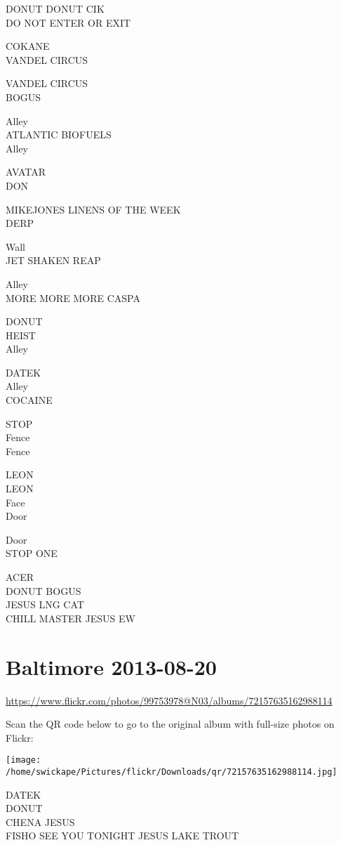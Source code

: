\documentclass[10pt,letterpaper]{article}
\begin{document}
DONUT DONUT CIK\\
DO NOT ENTER OR EXIT

COKANE\\
VANDEL CIRCUS

VANDEL CIRCUS\\
BOGUS

Alley\\
ATLANTIC BIOFUELS\\
Alley

AVATAR\\
DON

MIKEJONES LINENS OF THE WEEK\\
DERP

Wall\\
JET SHAKEN REAP

Alley\\
MORE MORE MORE CASPA

DONUT\\
HEIST\\
Alley

DATEK\\
Alley\\
COCAINE

STOP\\
Fence\\
Fence

LEON\\
LEON\\
Face\\
Door

Door\\
STOP ONE

ACER\\
DONUT BOGUS\\
JESUS LNG CAT\\
CHILL MASTER JESUS EW


\section*{Baltimore 2013-08-20}

\url{https://www.flickr.com/photos/99753978@N03/albums/72157635162988114}

Scan the QR code below to go to the original album with full-size photos on Flickr:

\texttt{[image: /home/swickape/Pictures/flickr/Downloads/qr/72157635162988114.jpg]}


DATEK\\
DONUT\\
CHENA JESUS\\
FISHO SEE YOU TONIGHT JESUS LAKE TROUT
\end{document}
